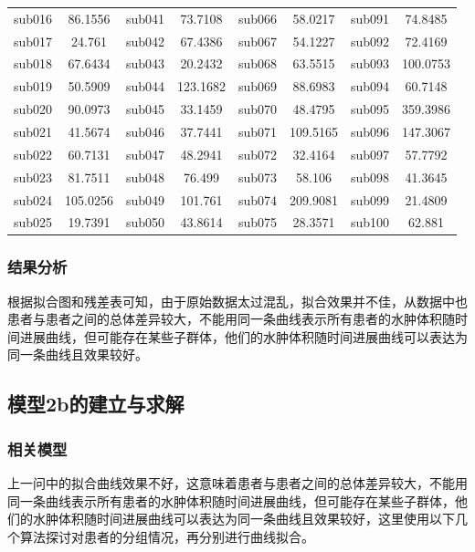 \documentclass[bwprint]{gmcmthesis}
\begin{document}
\begin{table}[!ht]
\begin{spacing}{0.7}
\begin{tabular}{cccccccc}
        sub016 & 86.1556 & sub041 & 73.7108 & sub066 & 58.0217 & sub091 & 74.8485 \\ 
        sub017 & 24.761 & sub042 & 67.4386 & sub067 & 54.1227 & sub092 & 72.4169 \\ 
        sub018 & 67.6434 & sub043 & 20.2432 & sub068 & 63.5515 & sub093 & 100.0753 \\ 
        sub019 & 50.5909 & sub044 & 123.1682 & sub069 & 88.6983 & sub094 & 60.7148 \\ 
        sub020 & 90.0973 & sub045 & 33.1459 & sub070 & 48.4795 & sub095 & 359.3986 \\ 
        sub021 & 41.5674 & sub046 & 37.7441 & sub071 & 109.5165 & sub096 & 147.3067 \\ 
        sub022 & 60.7131 & sub047 & 48.2941 & sub072 & 32.4164 & sub097 & 57.7792 \\ 
        sub023 & 81.7511 & sub048 & 76.499 & sub073 & 58.106 & sub098 & 41.3645 \\ 
        sub024 & 105.0256 & sub049 & 101.761 & sub074 & 209.9081 & sub099 & 21.4809 \\ 
        sub025 & 19.7391 & sub050 & 43.8614 & sub075 & 28.3571 & sub100 & 62.881 \\ \hline
    \end{tabular}
    \end{spacing}
    
\end{table}


\subsubsection{结果分析}
根据拟合图和残差表可知，由于原始数据太过混乱，拟合效果并不佳，从数据中也患者与患者之间的总体差异较大，不能用同一条曲线表示所有患者的水肿体积随时间进展曲线，但可能存在某些子群体，他们的水肿体积随时间进展曲线可以表达为同一条曲线且效果较好。
\subsection{模型2b的建立与求解}
\subsubsection{相关模型}

上一问中的拟合曲线效果不好，这意味着患者与患者之间的总体差异较大，不能用同一条曲线表示所有患者的水肿体积随时间进展曲线，但可能存在某些子群体，他们的水肿体积随时间进展曲线可以表达为同一条曲线且效果较好，这里使用以下几个算法探讨对患者的分组情况，再分别进行曲线拟合。
\end{document}
